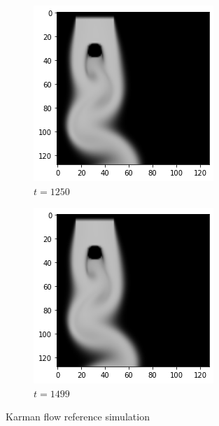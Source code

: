 \documentclass[a4paper,12pt,twoside]{report}
\begin{document}
\begin{figure}
\begin{subfigure}{0.18\textwidth}
	\end{subfigure}
	\begin{subfigure}{0.18\textwidth}
		\centering
		\includegraphics[scale=0.3]{timecost/ref1250.png}
		\caption{$t=1250$}
	\end{subfigure}
	\begin{subfigure}{0.18\textwidth}
		\centering
		\includegraphics[scale=0.3]{timecost/ref1499.png}
		\caption{$t=1499$}
	\end{subfigure}
	\caption{Karman flow reference simulation}
\end{figure}
\end{document}

